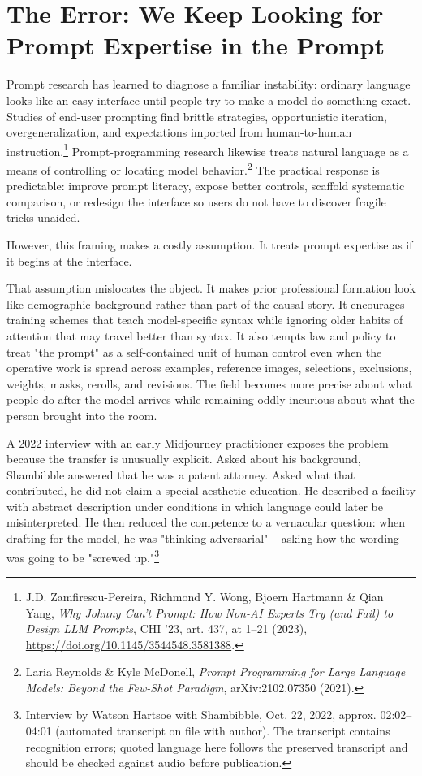 \documentclass[11pt]{article}
\begin{document}
\section{The Error: We Keep Looking for Prompt Expertise in the Prompt}

Prompt research has learned to diagnose a familiar instability: ordinary language looks like an easy interface until people try to make a model do something exact. Studies of end-user prompting find brittle strategies, opportunistic iteration, overgeneralization, and expectations imported from human-to-human instruction.\footnote{J.D. Zamfirescu-Pereira, Richmond Y. Wong, Bjoern Hartmann \& Qian Yang, \textit{Why Johnny Can't Prompt: How Non-AI Experts Try (and Fail) to Design LLM Prompts}, CHI '23, art. 437, at 1--21 (2023), \url{https://doi.org/10.1145/3544548.3581388}.} Prompt-programming research likewise treats natural language as a means of controlling or locating model behavior.\footnote{Laria Reynolds \& Kyle McDonell, \textit{Prompt Programming for Large Language Models: Beyond the Few-Shot Paradigm}, arXiv:2102.07350 (2021).} The practical response is predictable: improve prompt literacy, expose better controls, scaffold systematic comparison, or redesign the interface so users do not have to discover fragile tricks unaided.

However, this framing makes a costly assumption. It treats prompt expertise as if it begins at the interface.

That assumption mislocates the object. It makes prior professional formation look like demographic background rather than part of the causal story. It encourages training schemes that teach model-specific syntax while ignoring older habits of attention that may travel better than syntax. It also tempts law and policy to treat "the prompt" as a self-contained unit of human control even when the operative work is spread across examples, reference images, selections, exclusions, weights, masks, rerolls, and revisions. The field becomes more precise about what people do after the model arrives while remaining oddly incurious about what the person brought into the room.

A 2022 interview with an early Midjourney practitioner exposes the problem because the transfer is unusually explicit. Asked about his background, Shambibble answered that he was a patent attorney. Asked what that contributed, he did not claim a special aesthetic education. He described a facility with abstract description under conditions in which language could later be misinterpreted. He then reduced the competence to a vernacular question: when drafting for the model, he was "thinking adversarial" -- asking how the wording was going to be "screwed up."\footnote{Interview by Watson Hartsoe with Shambibble, Oct. 22, 2022, approx. 02:02--04:01 (automated transcript on file with author). The transcript contains recognition errors; quoted language here follows the preserved transcript and should be checked against audio before publication.}
\end{document}
